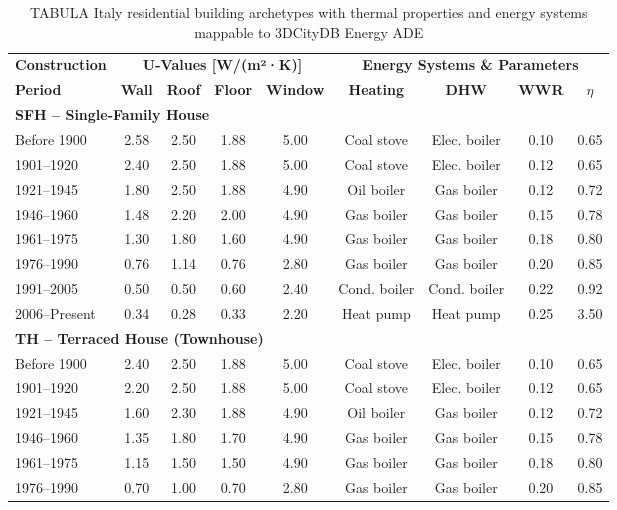 \begin{table}[htbp]
\centering
\caption{TABULA Italy residential building archetypes with thermal properties and energy systems mappable to 3DCityDB Energy ADE}
\label{tab:tabula_italy}
\scriptsize
\begin{tabular}{l|cccc|cccc}
\toprule
\textbf{Construction} & \multicolumn{4}{c|}{\textbf{U-Values [W/(m²·K)]}} & \multicolumn{4}{c}{\textbf{Energy Systems \& Parameters}} \\
\textbf{Period} & \textbf{Wall} & \textbf{Roof} & \textbf{Floor} & \textbf{Window} & \textbf{Heating} & \textbf{DHW} & \textbf{WWR} & \textbf{$\eta$} \\
\midrule
\multicolumn{9}{l}{\textbf{SFH -- Single-Family House}} \\
\midrule
Before 1900 & 2.58 & 2.50 & 1.88 & 5.00 & Coal stove & Elec. boiler & 0.10 & 0.65 \\
1901--1920 & 2.40 & 2.50 & 1.88 & 5.00 & Coal stove & Elec. boiler & 0.12 & 0.65 \\
1921--1945 & 1.80 & 2.50 & 1.88 & 4.90 & Oil boiler & Gas boiler & 0.12 & 0.72 \\
1946--1960 & 1.48 & 2.20 & 2.00 & 4.90 & Gas boiler & Gas boiler & 0.15 & 0.78 \\
1961--1975 & 1.30 & 1.80 & 1.60 & 4.90 & Gas boiler & Gas boiler & 0.18 & 0.80 \\
1976--1990 & 0.76 & 1.14 & 0.76 & 2.80 & Gas boiler & Gas boiler & 0.20 & 0.85 \\
1991--2005 & 0.50 & 0.50 & 0.60 & 2.40 & Cond. boiler & Cond. boiler & 0.22 & 0.92 \\
2006--Present & 0.34 & 0.28 & 0.33 & 2.20 & Heat pump & Heat pump & 0.25 & 3.50 \\
\midrule
\multicolumn{9}{l}{\textbf{TH -- Terraced House (Townhouse)}} \\
\midrule
Before 1900 & 2.40 & 2.50 & 1.88 & 5.00 & Coal stove & Elec. boiler & 0.10 & 0.65 \\
1901--1920 & 2.20 & 2.50 & 1.88 & 5.00 & Coal stove & Elec. boiler & 0.12 & 0.65 \\
1921--1945 & 1.60 & 2.30 & 1.88 & 4.90 & Oil boiler & Gas boiler & 0.12 & 0.72 \\
1946--1960 & 1.35 & 1.80 & 1.70 & 4.90 & Gas boiler & Gas boiler & 0.15 & 0.78 \\
1961--1975 & 1.15 & 1.50 & 1.50 & 4.90 & Gas boiler & Gas boiler & 0.18 & 0.80 \\
1976--1990 & 0.70 & 1.00 & 0.70 & 2.80 & Gas boiler & Gas boiler & 0.20 & 0.85 \\

\end{tabular}
\end{table}
